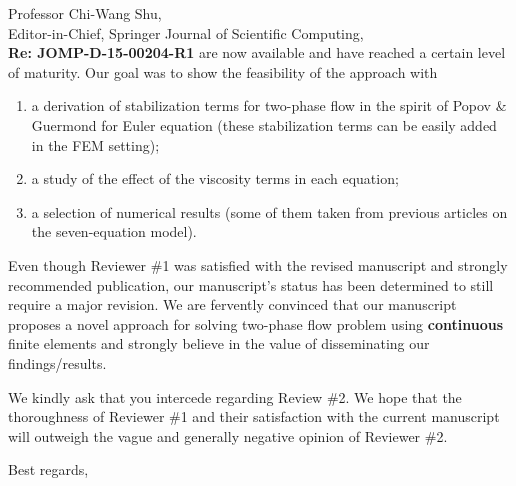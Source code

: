 \documentclass[11pt]{letter}
\begin{document}
\begin{letter}{Professor Chi-Wang Shu, \\  Editor-in-Chief, Springer Journal of Scientific Computing,\\
\textbf{Re: JOMP-D-15-00204-R1}}
are now available and have reached a certain level of maturity. Our goal was to show the feasibility of the approach with 
\begin{enumerate}
\item
a derivation of stabilization terms for two-phase flow in the spirit of Popov \& Guermond for Euler equation (these stabilization terms can be easily added in the FEM setting);
\item
a study of the effect of the viscosity terms in each equation;
\item 
a selection of numerical results (some of them taken from previous articles on the seven-equation model).
\end{enumerate}
 

\bigskip
Even though Reviewer \#1 was
satisfied with the revised manuscript and strongly recommended publication, our manuscript's status has been 
determined to still require a major revision. We are fervently
convinced that our manuscript proposes a novel approach for solving two-phase flow problem using {\bf continuous}
finite elements and strongly believe in the value of disseminating our findings/results. 

We kindly ask that you intercede regarding Review \#2.
We hope that the thoroughness of Reviewer \#1 and their
satisfaction with the current manuscript will outweigh the vague and generally negative opinion of Reviewer \#2.



\closing{Best regards, }

\end{letter}
\end{document}
